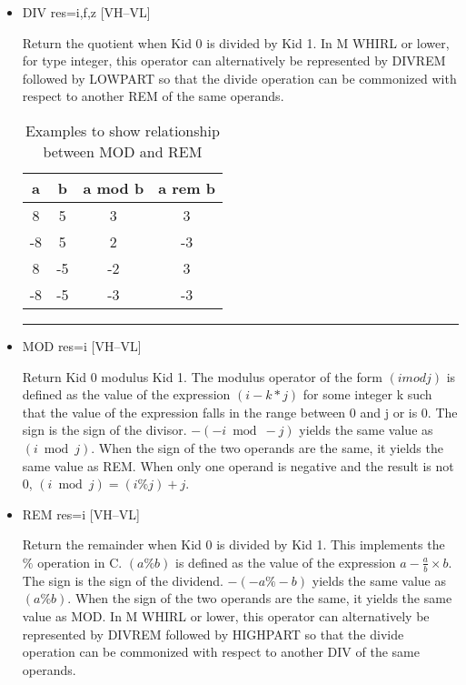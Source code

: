 \documentclass{article}
\begin{document}
\begin{itemize}
\item
{}%
DIV res=i,f,z \hfill [VH--VL]

Return the quotient when Kid 0 is divided by Kid 1. In M WHIRL
or lower, for type integer, this operator can alternatively be
represented by
%
DIVREM followed by
%
LOWPART so that the divide operation can be
commonized with respect to another
%
REM of the same operands.



\begin{table}
\begin{center}
\begin{tabular}{|c|c||c|c|}
\hline
a & b & a mod b & a rem b \\\hline\hline
8 &5 &3 &3 \\\hline
-8 &5 &2 &-3\\\hline
8 &-5 &-2 &3\\ \hline
-8 &-5 &-3 &-3\\
\hline
\end{tabular}
\end{center}
\hrule
\caption{Examples to show relationship between
%
MOD and
%
REM}
\end{table}

\item
{}%
MOD res=i \hfill [VH--VL]

Return Kid 0 modulus Kid 1. The modulus operator of the form $(i
mod j)$ is defined as the value of the expression $(i - k * j)$ for
some integer k such
that the value of the expression falls in the range between 0 and
j or is 0. The sign is the sign of the divisor. $-(-i \bmod -j)$ yields
the same value as $(i \bmod j)$. When the sign of the two operands are
the same, it yields the same value as
%
REM. When only one operand is negative and the result is not 0, $(i
\bmod j) = (i \% j) + j$.

\item
{}%
REM res=i \hfill [VH--VL]

Return the remainder when Kid 0 is divided by Kid 1. This implements the
$\%$ operation in C. $(a \% b)$ is defined as the value of the expression $a - \frac{a}{b}\times b$. The sign is the sign of the dividend. $-(-a \% -b)$ yields
the same value as $(a \% b)$. When the sign of the two operands are
the same, it yields the same value as
%
MOD. In M WHIRL or lower, this operator can alternatively be
represented by
%
DIVREM followed by
%
HIGHPART so that the divide operation can be
commonized with respect to another
%
DIV of the same operands.


\end{itemize}
\end{document}
